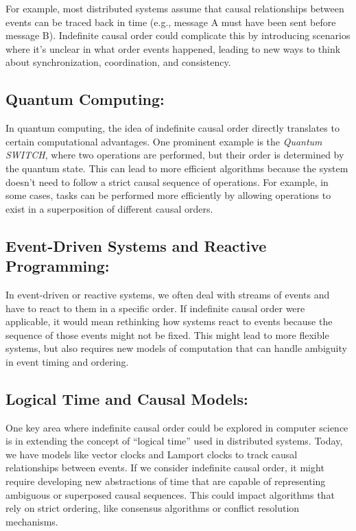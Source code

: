 For example, most distributed systems assume that causal relationships between events can be traced back in time (e.g., message A must have been sent before message B). Indefinite causal order could complicate this by introducing scenarios where it's unclear in what order events happened, leading to new ways to think about synchronization, coordination, and consistency.

\subsection*{Quantum Computing:}

In quantum computing, the idea of indefinite causal order directly translates to certain computational advantages. One prominent example is the \emph{Quantum SWITCH}, where two operations are performed, but their order is determined by the quantum state. This can lead to more efficient algorithms because the system doesn't need to follow a strict causal sequence of operations. For example, in some cases, tasks can be performed more efficiently by allowing operations to exist in a superposition of different causal orders.

\subsection*{Event-Driven Systems and Reactive Programming:}

In event-driven or reactive systems, we often deal with streams of events and have to react to them in a specific order. If indefinite causal order were applicable, it would mean rethinking how systems react to events because the sequence of those events might not be fixed. This might lead to more flexible systems, but also requires new models of computation that can handle ambiguity in event timing and ordering.

\subsection*{Logical Time and Causal Models:}

One key area where indefinite causal order could be explored in computer science is in extending the concept of ``logical time'' used in distributed systems. Today, we have models like vector clocks and Lamport clocks to track causal relationships between events. If we consider indefinite causal order, it might require developing new abstractions of time that are capable of representing ambiguous or superposed causal sequences. This could impact algorithms that rely on strict ordering, like consensus algorithms or conflict resolution mechanisms.

